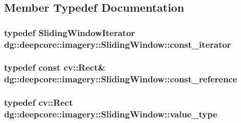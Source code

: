 \subsection{Member Typedef Documentation}
\subsubsection[{\texorpdfstring{const\+\_\+iterator}{const_iterator}}]{\setlength{\rightskip}{0pt plus 5cm}typedef {\bf Sliding\+Window\+Iterator} {\bf dg\+::deepcore\+::imagery\+::\+Sliding\+Window\+::const\+\_\+iterator}}\hypertarget{classdg_1_1deepcore_1_1imagery_1_1_sliding_window_aca1804ceef890966623a8acfcd01f2e9}{}\label{classdg_1_1deepcore_1_1imagery_1_1_sliding_window_aca1804ceef890966623a8acfcd01f2e9}
\subsubsection[{\texorpdfstring{const\+\_\+reference}{const_reference}}]{\setlength{\rightskip}{0pt plus 5cm}typedef const cv\+::\+Rect\& {\bf dg\+::deepcore\+::imagery\+::\+Sliding\+Window\+::const\+\_\+reference}}\hypertarget{classdg_1_1deepcore_1_1imagery_1_1_sliding_window_a73353ca1fb994a367f73d6d079b170e9}{}\label{classdg_1_1deepcore_1_1imagery_1_1_sliding_window_a73353ca1fb994a367f73d6d079b170e9}
\subsubsection[{\texorpdfstring{value\+\_\+type}{value_type}}]{\setlength{\rightskip}{0pt plus 5cm}typedef cv\+::\+Rect {\bf dg\+::deepcore\+::imagery\+::\+Sliding\+Window\+::value\+\_\+type}}\hypertarget{classdg_1_1deepcore_1_1imagery_1_1_sliding_window_aa709c18e431e937e57b72a869e2bf272}{}\label{classdg_1_1deepcore_1_1imagery_1_1_sliding_window_aa709c18e431e937e57b72a869e2bf272}
